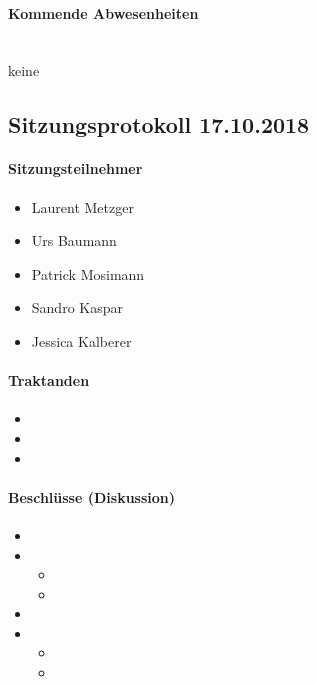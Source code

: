 \paragraph{Kommende Abwesenheiten} \mbox{}\\
keine

\newpage





\subsection{Sitzungsprotokoll 17.10.2018}

\paragraph{Sitzungsteilnehmer}
\begin{itemize}	
	\item Laurent Metzger 
	\item Urs Baumann
	\item Patrick Mosimann
	\item Sandro Kaspar
	\item Jessica Kalberer
\end{itemize}

\paragraph{Traktanden}
\begin{itemize}	
	\item 
	\item 
	\item 
\end{itemize}

\paragraph{Beschlüsse (Diskussion)}
\begin{itemize}	
	\item 
	\item 
	\begin{itemize}
		\item 
		\item
	\end{itemize}
	\item 
	\item 
	\begin{itemize}
		\item 
		\item 
	\end{itemize}
\end{itemize}

